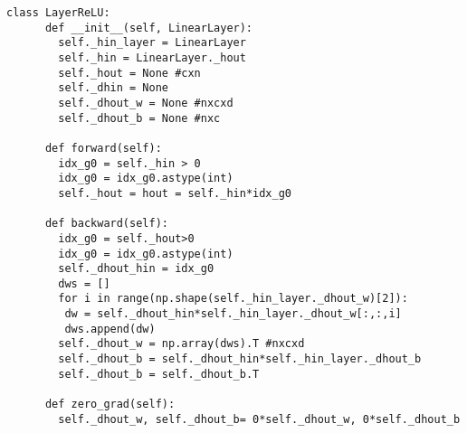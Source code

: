 \documentclass[12pt]{article}
\begin{document}
\begin{lstlisting}
class LayerReLU:
      def __init__(self, LinearLayer):
        self._hin_layer = LinearLayer
        self._hin = LinearLayer._hout
        self._hout = None #cxn    
        self._dhin = None 
        self._dhout_w = None #nxcxd 
        self._dhout_b = None #nxc 
     
      def forward(self):
        idx_g0 = self._hin > 0 
        idx_g0 = idx_g0.astype(int) 
        self._hout = hout = self._hin*idx_g0
    
      def backward(self):
        idx_g0 = self._hout>0 
        idx_g0 = idx_g0.astype(int) 
        self._dhout_hin = idx_g0 
        dws = [] 
        for i in range(np.shape(self._hin_layer._dhout_w)[2]): 
         dw = self._dhout_hin*self._hin_layer._dhout_w[:,:,i] 
         dws.append(dw) 
        self._dhout_w = np.array(dws).T #nxcxd
        self._dhout_b = self._dhout_hin*self._hin_layer._dhout_b 
        self._dhout_b = self._dhout_b.T

      def zero_grad(self):
        self._dhout_w, self._dhout_b= 0*self._dhout_w, 0*self._dhout_b
\end{lstlisting} 
\end{document}
